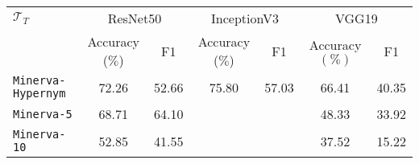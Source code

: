 \begin{tabular}{l|cc|cc|cc} \hline
	$\mathcal{T}_T$ &  \multicolumn{2}{c}{ResNet50} & \multicolumn{2}{|c|}{InceptionV3} & \multicolumn{2}{c}{VGG19}\\
			& Accuracy ($\%$) & F1 & Accuracy ($\%$) & F1 & Accuracy $(\%)$ & F1 \\\hline \hline
	\texttt{Minerva-Hypernym} & 72.26 & 52.66 & 75.80 & 57.03 & 66.41 & 40.35 \\
	\texttt{Minerva-5} & 68.71  & 64.10 & \cellcolor{yellow!25}{73.66} & \cellcolor{yellow!25}{70.29} & 48.33 & 33.92\\
	\texttt{Minerva-10} & 52.85 & 41.55  & \cellcolor{yellow!25}{55.51} & \cellcolor{yellow!25}{45.77} & 37.52 & 15.22 \\
\hline
\end{tabular}
